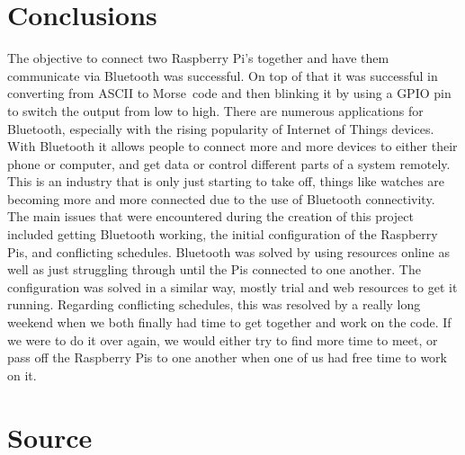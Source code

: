 \documentclass[11pt]{article}
\begin{document}
\section{Conclusions}
\label{sec:conclusions}


The objective to connect two Raspberry Pi's together and have them communicate via Bluetooth was successful.
On top of that it was successful in converting from ASCII to Morse~code and then blinking it by using a GPIO pin to switch the output from low to high.
There are numerous applications for Bluetooth, especially with the rising popularity of Internet of Things devices.
With Bluetooth it allows people to connect more and more devices to either their phone or computer, and get data or control different parts of a system remotely.
This is an industry that is only just starting to take off, things like watches are becoming more and more connected due to the use of Bluetooth connectivity.
The main issues that were encountered during the creation of this project included getting Bluetooth working, the initial configuration of the Raspberry Pis, and conflicting schedules.
Bluetooth was solved by using resources online as well as just struggling through until the Pis connected to one another.
The configuration was solved in a similar way, mostly trial and web resources to get it running.
Regarding conflicting schedules, this was resolved by a really long weekend when we both finally had time to get together and work on the code.
If we were to do it over again, we would either try to find more time to meet, or pass off the Raspberry Pis to one another when one of us had free time to work on it.


\break
\section{Source}
\label{sec:source}



\end{document}
